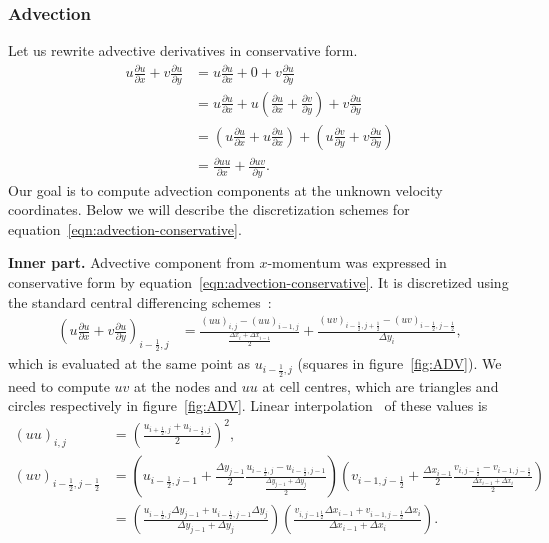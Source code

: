 \documentclass{article}
\begin{document}
\subsubsection{Advection}

Let us rewrite advective derivatives in conservative form. 
\begin{align}\label{eqn:advection-conservative}
	u\frac{\partial u}{\partial x}+v \frac{\partial u}{\partial y}
	&=u\frac{\partial u}{\partial x}+0+v \frac{\partial u}{\partial y}\nonumber\\
	&= u\frac{\partial u}{\partial x}+ u\left(\frac{\partial u}{\partial x} +\frac{\partial v}{\partial y}\right ) +v \frac{\partial u}{\partial y}\nonumber\\
	&=\left(u\frac{\partial u}{\partial x}+ u\frac{\partial u}{\partial x}\right ) +\left(u\frac{\partial v}{\partial y} +v \frac{\partial u}{\partial y}\right )\nonumber\\
	&=\frac{\partial uu}{\partial x}+ \frac{\partial uv}{\partial y}.
\end{align}
Our goal is to compute advection components at the unknown velocity coordinates. Below we will describe the discretization schemes for equation~\eqref{eqn:advection-conservative}. 

\textbf{Inner part.} 
Advective component from $x$-momentum was expressed in conservative form by equation~\eqref{eqn:advection-conservative}. It is discretized using the standard central differencing schemes~\cite{Colonius:2008}:
\begin{align*}
	\left (u\frac{\partial u}{\partial x}+v \frac{\partial u}{\partial y}\right)_{i-\frac{1}{2},j}&=\frac{(uu)_{i
	,j}-(uu)_{i- 1,j}}{\frac{\Delta x_i+\Delta x_{i-1}}{2}}+\frac{(uv)_{i-\frac{1}{2},j+\frac{1}{2}}-(uv)_{i-\frac{1}{2},j-\frac{1}{2}}}{\Delta y_i},
\end{align*}
which is evaluated at the same point as $u_{i-\frac{1}{2},j}$ (squares in figure~\ref{fig:ADV}). We need to compute $uv$ at the nodes and $uu$ at cell centres, which are triangles and circles respectively in figure~\ref{fig:ADV}. Linear interpolation~\cite{Colonius:2008} of these values is
\begin{align*}
  (uu)_{i,j}&=\left(\frac{u_{i+\frac{1}{2},j}+u_{i-\frac{1}{2},j}}{2}\right)^2,\\
  (uv)_{i-\frac{1}{2},j-\frac{1}{2}}&=\left(u_{i-\frac{1}{2},j-1} + \frac{\Delta y_{j-1}}{2}\frac{u_{i-\frac{1}{2},j}-u_{i-\frac{1}{2},j-1}}{\frac{\Delta y_{j-1} +\Delta y_j}{2}} \right) \left( v_{i-1,j-\frac{1}{2}} + \frac{\Delta x_{i-1}}{2}\frac{v_{i,j-\frac{1}{2}}-v_{i-1,j-\frac{1}{2}}}{\frac{\Delta x_{i-1} +\Delta x_i}{2}}\right)\\
  &=\left(\frac{u_{i-\frac{1}{2},j}\Delta y_{j-1} +u_{i-\frac{1}{2},j-1}\Delta y_j}{\Delta y_{j-1}+\Delta y_{j}}\right )\left ( \frac{v_{i,j-1\frac{1}{2}}\Delta x_{i-1} +v_{i-1,j-\frac{1}{2}}\Delta x_i}{\Delta x_{i-1}+\Delta x_{i}}\right).
\end{align*}
\end{document}
